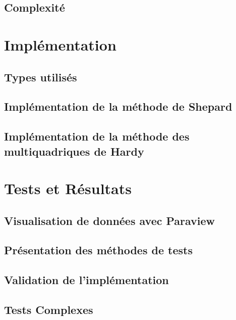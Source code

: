\documentclass[a4paper,9pt]{article}
\begin{document}
\subsection{Complexité}
\label{subsec:hardy_complexite}

\section{Implémentation}
\label{sec:implementation}

\subsection{Types utilisés}
\label{subsec:types}

\subsection{Implémentation de la méthode de Shepard}
\label{subsec:shepard_implementation}

\subsection{Implémentation de la méthode des multiquadriques de Hardy}
\label{subsec:hardy_implementation}

\section{Tests et Résultats}
\label{sec:tests_resultats}

\subsection{Visualisation de données avec Paraview}
\label{subsec:paraview}

\subsection{Présentation des méthodes de tests}
\label{subsec:presentation_tests}

\subsection{Validation de l'implémentation}
\label{subsec:validation_implementation}

\subsection{Tests Complexes}
\label{subsec:tests_complexes}
\end{document}
